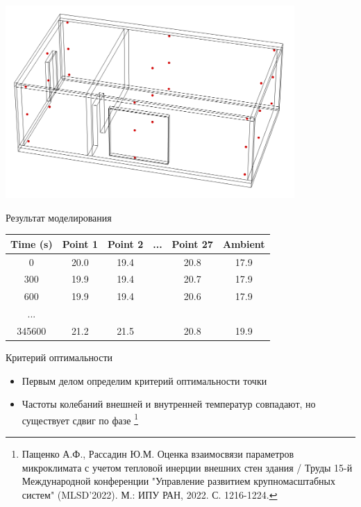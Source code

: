 \documentclass[14pt,aspectratio=169,hyperref={pdftex,unicode},xcolor=dvipsnames]{beamer}
\begin{document}
\begin{frame}

\begin{center}
\includegraphics[width=11cm]{images/interesting_points.png}
\end{center}

\end{frame}



\begin{frame}{Результат моделирования}
\centering
\begin{table}[]
\begin{tabular}{c|c|c|c|c|c}
\textbf{Time (s)} & \textbf{Point 1} & \textbf{Point 2} & ... & \textbf{Point 27} & \textbf{Ambient} \\ \hline
0                 & 20.0             & 19.4             &     & 20.8              & 17.9             \\
300               & 19.9             & 19.4             &     & 20.7              & 17.9             \\
600               & 19.9             & 19.4             &     & 20.6              & 17.9             \\
...               &                  &                  &     &                   &                  \\
345600            & 21.2             & 21.5             &     & 20.8              & 19.9            
\end{tabular}
\end{table}

\end{frame}



\begin{frame}{Критерий оптимальности}

\begin{itemize}
\item Первым делом определим критерий оптимальности точки
\item Частоты колебаний внешней и внутренней температур совпадают, но существует сдвиг по фазе \footnote{Пащенко А.Ф., Рассадин Ю.М. Оценка взаимосвязи параметров микроклимата с учетом тепловой инерции внешних стен здания / Труды 15-й Международной конференции "Управление развитием крупномасштабных систем" (MLSD’2022). М.: ИПУ РАН, 2022. С. 1216-1224.}
\end{itemize}

\end{frame}
\end{document}
